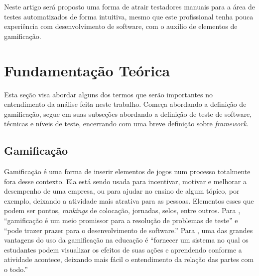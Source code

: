 \documentclass[twoside,english,brazilian]{UNISINOSartigo}
\begin{document}

Neste artigo será proposto uma forma de atrair testadores manuais para a área de testes automatizados de forma intuitiva, mesmo que este profissional tenha pouca experiência com desenvolvimento de software, com o auxílio de elementos de gamificação.
 


\section{Fundamentação Teórica}

Esta seção visa abordar alguns dos termos que serão importantes no entendimento da análise feita neste trabalho. Começa abordando a definição de gamificação, segue em suas subseções abordando a definição de teste de software, técnicas e níveis de teste, encerrando com uma breve definição sobre \textit{framework}.

\subsection{Gamificação}

Gamificação é uma forma de inserir elementos de jogos num processo totalmente fora desse contexto.
Ela está sendo usada para incentivar, motivar e melhorar a desempenho de uma empresa, ou para ajudar no ensino de algum tópico, por exemplo, deixando a atividade mais atrativa para as pessoas. Elementos esses que podem ser pontos, \textit{rankings} de colocação, jornadas, selos, entre outros. Para \cite{DeJesus}, ``gamificação é um meio promissor para a resolução de problemas de teste'' e ``pode trazer prazer para o desenvolvimento de software.'' Para \cite{Elgrably}, uma das grandes vantagens do uso da gamificação na educação é ``fornecer um sistema no qual os estudantes podem visualizar os efeitos de suas ações e aprendendo conforme a atividade acontece, deixando mais fácil o entendimento da relação das partes com o todo.''

\end{document}
